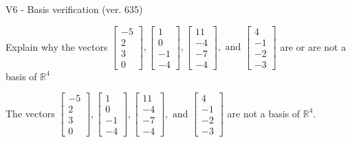 \begin{exercise}
  \begin{exerciseTitle}V6 - Basis verification (ver. 635)\end{exerciseTitle}
  \begin{exerciseStatement}
    Explain why the vectors \(\left[\begin{array}{r}
-5 \\
2 \\
3 \\
0
\end{array}\right] , \left[\begin{array}{r}
1 \\
0 \\
-1 \\
-4
\end{array}\right] , \left[\begin{array}{r}
11 \\
-4 \\
-7 \\
-4
\end{array}\right] , \text{ and } \left[\begin{array}{r}
4 \\
-1 \\
-2 \\
-3
\end{array}\right]\) are or are not a basis of \(\mathbb{R}^4\)	


  \end{exerciseStatement}
  \begin{exerciseAnswer}
   The vectors \(\left[\begin{array}{r}
-5 \\
2 \\
3 \\
0
\end{array}\right] , \left[\begin{array}{r}
1 \\
0 \\
-1 \\
-4
\end{array}\right] , \left[\begin{array}{r}
11 \\
-4 \\
-7 \\
-4
\end{array}\right] , \text{ and } \left[\begin{array}{r}
4 \\
-1 \\
-2 \\
-3
\end{array}\right]\) 
  	 are not  a basis of \(\mathbb{R}^4\).
  


  \end{exerciseAnswer}
\end{exercise}